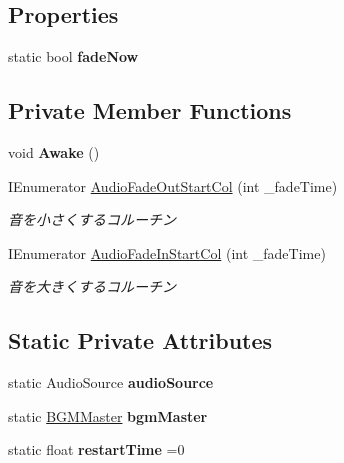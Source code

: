 \subsection*{Properties}
\begin{DoxyCompactItemize}
\item 
\mbox{\label{class_b_g_m_master_ad8e147d8a9c6ac76b07f929f02fe6088}} 
static bool {\bfseries fade\+Now}
\end{DoxyCompactItemize}
\subsection*{Private Member Functions}
\begin{DoxyCompactItemize}
\item 
\mbox{\label{class_b_g_m_master_a3d5b40682a36ac9f00a0b2145efaac08}} 
void {\bfseries Awake} ()
\item 
I\+Enumerator \hyperlink{class_b_g_m_master_a6807a80ef8801c30fecfd4ea7e97bc7c}{Audio\+Fade\+Out\+Start\+Col} (int \+\_\+fade\+Time)
\begin{DoxyCompactList}\small\item\em 音を小さくするコルーチン \end{DoxyCompactList}\item 
I\+Enumerator \hyperlink{class_b_g_m_master_a3666e5162008d1b647d6533a7a1c420d}{Audio\+Fade\+In\+Start\+Col} (int \+\_\+fade\+Time)
\begin{DoxyCompactList}\small\item\em 音を大きくするコルーチン \end{DoxyCompactList}\end{DoxyCompactItemize}
\subsection*{Static Private Attributes}
\begin{DoxyCompactItemize}
\item 
\mbox{\label{class_b_g_m_master_af8cd1a45f44de1a1dd52997ad6aeef98}} 
static Audio\+Source {\bfseries audio\+Source}
\item 
\mbox{\label{class_b_g_m_master_a9c5995ac4dd5442574bca5c5796b0c35}} 
static \hyperlink{class_b_g_m_master}{B\+G\+M\+Master} {\bfseries bgm\+Master}
\item 
\mbox{\label{class_b_g_m_master_a14a7fb2480aaea3f3d3dce5cdcd40490}} 
static float {\bfseries restart\+Time} =0
\end{DoxyCompactItemize}


